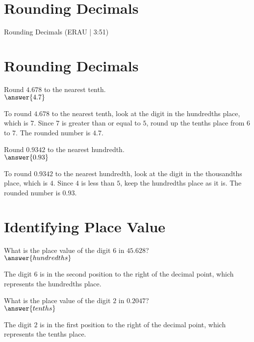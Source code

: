 \documentclass{ximera}
\begin{document}

\section*{Rounding Decimals}

Rounding Decimals (ERAU | 3:51)


\section*{Rounding Decimals}

\begin{problem}
Round $4.678$ to the nearest tenth.\\
$\answer{4.7}$
\begin{feedback}
To round $4.678$ to the nearest tenth, look at the digit in the hundredths place, which is $7$. Since $7$ is greater than or equal to $5$, round up the tenths place from $6$ to $7$. The rounded number is $4.7$.
\end{feedback}
\end{problem}

\begin{problem}
Round $0.9342$ to the nearest hundredth.\\
$\answer{0.93}$
\begin{feedback}
To round $0.9342$ to the nearest hundredth, look at the digit in the thousandths place, which is $4$. Since $4$ is less than $5$, keep the hundredths place as it is. The rounded number is $0.93$.
\end{feedback}
\end{problem}

\section*{Identifying Place Value}

\begin{problem}
What is the place value of the digit $6$ in $45.628$?\\
$\answer{hundredths}$
\begin{feedback}
The digit $6$ is in the second position to the right of the decimal point, which represents the hundredths place.
\end{feedback}
\end{problem}

\begin{problem}
What is the place value of the digit $2$ in $0.2047$?\\
$\answer{tenths}$
\begin{feedback}
The digit $2$ is in the first position to the right of the decimal point, which represents the tenths place.
\end{feedback}
\end{problem}
\end{document}
